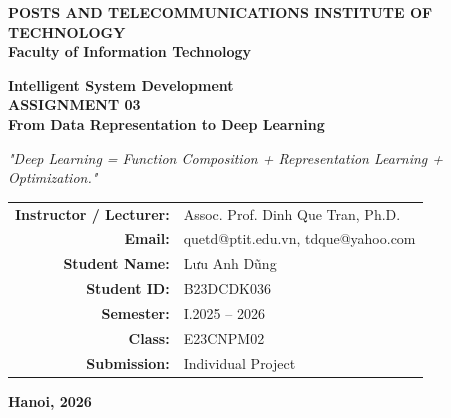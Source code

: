 \documentclass[11pt, a4paper]{article}
\begin{document}
\begin{titlepage}
\begin{center}

\vspace*{0.5cm}

\Large
\textbf{POSTS AND TELECOMMUNICATIONS INSTITUTE OF TECHNOLOGY}\\
\textbf{Faculty of Information Technology}

\vspace{2.0cm}

\Huge
\textbf{Intelligent System Development}\\
\vspace{0.4cm}
\LARGE
\textbf{ASSIGNMENT 03}\\
\vspace{0.6cm}
\Large
\textbf{From Data Representation to Deep Learning}

\vspace{1.2cm}

\large
\textit{"Deep Learning = Function Composition + Representation Learning + Optimization."}

\vfill

\normalsize
\begin{tabular}{rl}
\textbf{Instructor / Lecturer:} & Assoc. Prof. Dinh Que Tran, Ph.D. \\
\textbf{Email:} & quetd@ptit.edu.vn, tdque@yahoo.com \\[0.8cm]
\textbf{Student Name:} & Lưu Anh Dũng \\
\textbf{Student ID:} & B23DCDK036 \\
\textbf{Semester:} & I.2025 -- 2026 \\
\textbf{Class:} & E23CNPM02 \\
\textbf{Submission:} & Individual Project \\
\end{tabular}

\vfill

\textbf{Hanoi, 2026}

\vspace{0.5cm}

\end{center}
\end{titlepage}

\tableofcontents
\newpage
\end{document}

